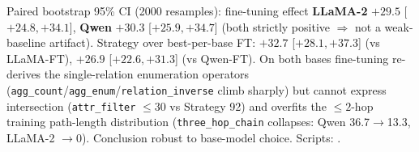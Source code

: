 \documentclass[11pt,a4paper]{article}
\newcommand{\qtype}[1]{\texttt{\small #1}}
\begin{document}
Paired bootstrap 95\% CI (2000 resamples): fine-tuning effect \textbf{LLaMA-2} $+29.5$ [$+24.8, +34.1$], \textbf{Qwen} $+30.3$ [$+25.9, +34.7$] (both strictly positive $\Rightarrow$ not a weak-baseline artifact). Strategy over best-per-base FT: $+32.7$ [$+28.1, +37.3$] (vs LLaMA-FT), $+26.9$ [$+22.6, +31.3$] (vs Qwen-FT). On both bases fine-tuning re-derives the single-relation enumeration operators (\qtype{agg\_count}/\qtype{agg\_enum}/\qtype{relation\_inverse} climb sharply) but cannot express intersection (\qtype{attr\_filter} $\leq$30 vs Strategy 92) and overfits the ${\leq}2$-hop training path-length distribution (\qtype{three\_hop\_chain} collapses: Qwen 36.7$\to$13.3, LLaMA-2 $\to$0). Conclusion robust to base-model choice. Scripts: .
\end{document}
